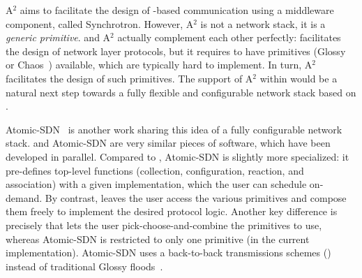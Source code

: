 A$^2$ aims to facilitate the design of \ST-based communication using a middleware component, called Synchrotron. However, A$^2$ is not a network stack, it is a \emph{generic \ST primitive}.
\baloo and A$^2$ actually complement each other perfectly:
\baloo facilitates the design of network layer protocols, but it requires to have \ST primitives (\eg Glossy~\cite{ferrari2011Glossy} or Chaos~\cite{landsiedel2013Chaos}) available, which are typically hard to implement.
In turn, A$^2$ facilitates the design of such \ST primitives.
The support of A$^2$ within \baloo would be a natural next step towards a fully flexible and configurable network stack based on \ST.

Atomic-SDN~\cite{baddeley2019AtomicSDN} is another work sharing this idea of a fully configurable network stack. \baloo and Atomic-SDN are very similar pieces of software, which have been developed in parallel.
Compared to \baloo, Atomic-SDN is slightly more specialized: it pre-defines top-level functions (collection, configuration, reaction, and association) with a given implementation, which the user can schedule on-demand. By contrast, \baloo leaves the user  access the various \ST primitives and compose them freely to implement the desired protocol logic.
Another key difference is precisely that \baloo lets the user pick-choose-and-combine the primitives to use, whereas Atomic-SDN is restricted to only one primitive (in the current implementation). Atomic-SDN uses a back-to-back transmissions schemes (\cite{baddeley2019Competition, lim2017Competition}) instead of traditional Glossy floods~\cite{ferrari2011Glossy}.
